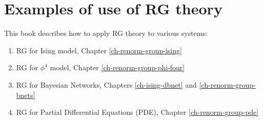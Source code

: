 \section{Examples of use of RG theory}
\label{sec-rg-examples}

This book describes how to 
apply RG theory to various systems:

\begin{enumerate}
\item RG for Ising model, Chapter \ref{ch-renorm-group-ising}

\item RG for $\phi^4$ model, Chapter \ref{ch-renorm-group-phi-four}

\item RG for Bayesian Networks, Chapters \ref{ch-ising-dbnet}
and \ref{ch-renorm-group-bnets}

\item RG for Partial Differential Equations (PDE), Chapter \ref{ch-renorm-group-pde}
\end{enumerate}


